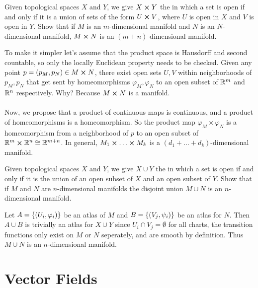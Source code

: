\documentclass[10pt]{article}
\begin{document}
\begin{example}\label{b1e5}
	Given topological spaces $X$ and $Y$, we give $X \cross Y$ the 
	in which a set is open if and only if it is a union of sets of the form $U \cross V$,
	where $U$ is open in $X$ and $V$ is open in $Y$. Show that if $M$ is an $m$-dimensional
	manifold and $N$ is an $N$-dimensional
	manifold, $M \cross N$ is an $(m+n)$-dimensional manifold.
\end{example}
\sol To make it simpler let's assume that the product space is Hausdorff and second
countable, so only the locally Euclidean property needs to be checked. Given any point
$p = (p_M, p_N) \in M \cross N$, there exist open sets $U, V$ within neighborhoods of $p_M, p_N$
that get sent by homeomorphisms $\varphi_M, \varphi_N$ to an open subset of $\mathbb{R}^m$ and $\mathbb{R}^n$ respectively.
Why? Because $M \cross N$ is a manifold.\\\\
Now, we propose that a product of continuous
maps is continuous, and a product of homeomorphisms is a homeomorphism. So the product map
$\varphi_M \times \varphi_N$ is a homeomorphism from a neighborhood of $p$ to an open subset
of $\mathbb{R}^m \cross \mathbb{R}^n \cong \mathbb{R}^{m+n}$. In general, $M_1 \cross \dots \cross M_k$ is a $(d_1 + \dots + d_k)$-dimensional manifold.


\begin{example}
	Given topological spaces $X$ and $Y$, we give $X \cup Y$ the 
	in which a set is open if and only if it is the union of an open subset of $X$
	and an open subset of $Y$. Show that if $M$ and $N$ are $n$-dimensional manifolds
	the disjoint union $M \cup N$ is an $n$-dimensional manifold.
\end{example}
\sol Let $A = \lbrace(U_i, \varphi_i)\rbrace$ be an atlas of $M$ and $B = \lbrace(V_j, \psi_i)\rbrace$ be an atlas for $N$.
Then $A \cup B$ is trivially an atlas for $X \cup Y$ since $U_i \cap V_j = \emptyset$
for all charts, the transition functions only exist on $M$ or $N$ seperately, and are smooth by definition.
Thus $M \cup N$ is an $n$-dimensional manifold.




\newpage
\section{Vector Fields}\label{b1c3}
\end{document}
